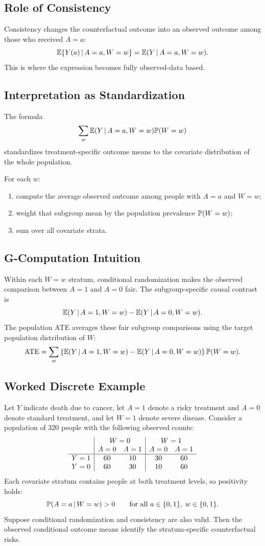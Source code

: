 \subsection{Role of Consistency}

Consistency changes the counterfactual outcome into an observed outcome among those who received $A=a$:
\[
\mathbb{E}\{Y(a)\,\vert\, A=a,W=w\}
=
\mathbb{E}(Y\,\vert\, A=a,W=w).
\]
This is where the expression becomes fully observed-data based.

\subsection{Interpretation as Standardization}

The formula
\[
\sum_w \mathbb{E}(Y\,\vert\, A=a,W=w)\mathbb{P}(W=w)
\]
standardizes treatment-specific outcome means to the covariate distribution of the whole population.

For each $w$:
\begin{enumerate}
  \item compute the average observed outcome among people with $A=a$ and $W=w$;
  \item weight that subgroup mean by the population prevalence $\mathbb{P}(W=w)$;
  \item sum over all covariate strata.
\end{enumerate}

\subsection{G-Computation Intuition}

Within each $W=w$ stratum, conditional randomization makes the observed comparison between $A=1$ and $A=0$ fair. The subgroup-specific causal contrast is
\[
\mathbb{E}(Y\,\vert\, A=1,W=w)-\mathbb{E}(Y\,\vert\, A=0,W=w).
\]
The population ATE averages these fair subgroup comparisons using the target population distribution of $W$:
\[
\operatorname{ATE}
=
\sum_w
\left\{
\mathbb{E}(Y\,\vert\, A=1,W=w)-\mathbb{E}(Y\,\vert\, A=0,W=w)
\right\}\mathbb{P}(W=w).
\]

\subsection{Worked Discrete Example}

Let $Y$ indicate death due to cancer, let $A=1$ denote a risky treatment and
$A=0$ denote standard treatment, and let $W=1$ denote severe disease. Consider a
population of 320 people with the following observed counts:
\[
\begin{array}{c|cc|cc}
& \multicolumn{2}{c|}{W=0} & \multicolumn{2}{c}{W=1}\\
& A=0 & A=1 & A=0 & A=1\\
\hline
Y=1 & 60 & 10 & 30 & 60\\
Y=0 & 60 & 30 & 10 & 60
\end{array}
\]
Each covariate stratum contains people at both treatment levels, so positivity holds:
\[
\mathbb{P}(A=a\,\vert\, W=w)>0
\qquad\text{for all }a\in\{0,1\},\;w\in\{0,1\}.
\]
Suppose conditional randomization and consistency are also valid. Then the observed
conditional outcome means identify the stratum-specific counterfactual risks.

